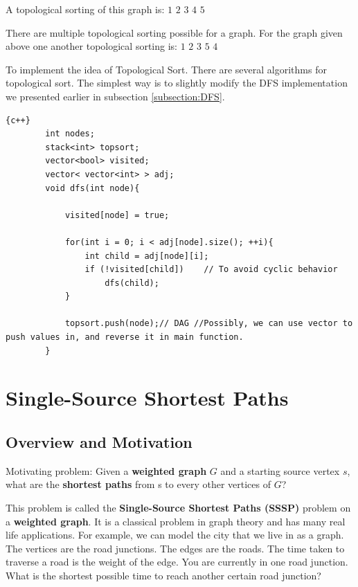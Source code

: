 A topological sorting of this graph is: $1$ $2$ $3$ $4$ $5$

There are multiple topological sorting possible for a graph. For the graph given above one another topological sorting is: $1$ $2$ $3$ $5$ $4$

To implement the idea of Topological Sort. There are several algorithms for topological sort. The simplest way is to slightly modify the DFS implementation we presented earlier in subsection \ref{subsection:DFS}.

\newpage

\begin{lstlisting}{c++}
        int nodes;
        stack<int> topsort;
        vector<bool> visited;
        vector< vector<int> > adj;
        void dfs(int node){
        
        	visited[node] = true;
        
        	for(int i = 0; i < adj[node].size(); ++i){
        		int child = adj[node][i];
        		if (!visited[child])	// To avoid cyclic behavior
        			dfs(child);
        	}
        
        	topsort.push(node);// DAG //Possibly, we can use vector to push values in, and reverse it in main function.
        }
\end{lstlisting}

\newpage

\section{Single-Source Shortest Paths}\label{sec:Single-Source Shortest Paths}
\subsection{ Overview and Motivation}
Motivating problem: Given a \textbf{weighted graph} $G$ and a starting source vertex $s$, what are the \textbf{shortest paths} from s to every other vertices of $G$?

\hspace{7mm} This problem is called the \textbf{Single-Source Shortest Paths (SSSP)} problem on a \textbf{weighted graph}. It is a classical problem in graph theory and has many real life applications. For example, we can model the city that we live in as a graph. The vertices are the road junctions. The edges are the roads. The time taken to traverse a road is the weight of the edge. You are currently in one road junction. What is the shortest possible time to reach another certain road junction?

